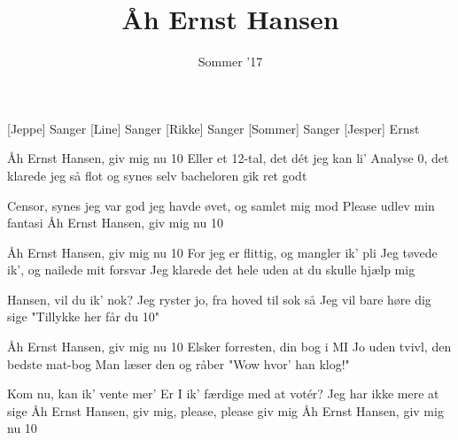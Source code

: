 \documentclass[a4paper,11pt]{article}
\title{Åh Ernst Hansen}
\author{Sommer '17}
\begin{document}
\maketitle

\begin{roles}
[Jeppe] Sanger
[Line] Sanger
[Rikke] Sanger
[Sommer] Sanger
 [Jesper] Ernst
\end{roles}

\begin{song}
 Åh Ernst Hansen, giv mig nu 10
Eller et 12-tal, det dét jeg kan li'
Analyse 0, det klarede jeg så flot
og synes selv bacheloren gik ret godt

 Censor, synes jeg var god
jeg havde øvet, og samlet mig mod
Please udlev min fantasi
Åh Ernst Hansen, giv mig nu 10
 
 Åh Ernst Hansen, giv mig nu 10
For jeg er flittig, og mangler ik' pli
Jeg tøvede ik', og nailede mit forsvar
Jeg klarede det hele uden at du skulle hjælp mig

 Hansen, vil du ik' nok?
Jeg ryster jo, fra hoved til sok
så Jeg vil bare høre dig sige
"Tillykke her får du 10"

 Åh Ernst Hansen, giv mig nu 10
Elsker forresten, din bog i MI
Jo uden tvivl, den bedste mat-bog
Man læser den og råber "Wow hvor' han klog!"

 Kom nu, kan ik' vente mer'
Er I ik' færdige med at votér?
Jeg har ikke mere at sige
Åh Ernst Hansen, giv mig, please, please giv mig
Åh Ernst Hansen, giv mig nu 10
\end{song}

\end{document}
